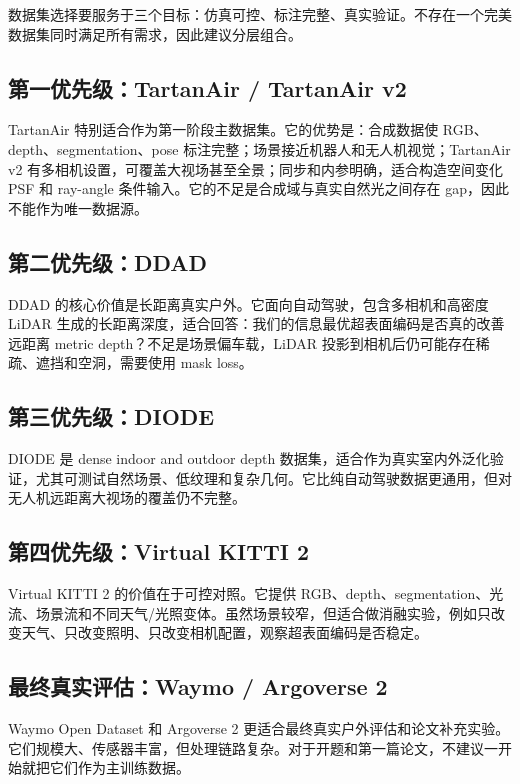 \documentclass[11pt,a4paper,fontset=none]{ctexart}
\begin{document}
数据集选择要服务于三个目标：仿真可控、标注完整、真实验证。不存在一个完美数据集同时满足所有需求，因此建议分层组合。

\subsection{第一优先级：TartanAir / TartanAir v2}

TartanAir 特别适合作为第一阶段主数据集。它的优势是：合成数据使 RGB、depth、segmentation、pose 标注完整；场景接近机器人和无人机视觉；TartanAir v2 有多相机设置，可覆盖大视场甚至全景；同步和内参明确，适合构造空间变化 PSF 和 ray-angle 条件输入。它的不足是合成域与真实自然光之间存在 gap，因此不能作为唯一数据源。

\subsection{第二优先级：DDAD}

DDAD 的核心价值是长距离真实户外。它面向自动驾驶，包含多相机和高密度 LiDAR 生成的长距离深度，适合回答：我们的信息最优超表面编码是否真的改善远距离 metric depth？不足是场景偏车载，LiDAR 投影到相机后仍可能存在稀疏、遮挡和空洞，需要使用 mask loss。

\subsection{第三优先级：DIODE}

DIODE 是 dense indoor and outdoor depth 数据集，适合作为真实室内外泛化验证，尤其可测试自然场景、低纹理和复杂几何。它比纯自动驾驶数据更通用，但对无人机远距离大视场的覆盖仍不完整。

\subsection{第四优先级：Virtual KITTI 2}

Virtual KITTI 2 的价值在于可控对照。它提供 RGB、depth、segmentation、光流、场景流和不同天气/光照变体。虽然场景较窄，但适合做消融实验，例如只改变天气、只改变照明、只改变相机配置，观察超表面编码是否稳定。

\subsection{最终真实评估：Waymo / Argoverse 2}

Waymo Open Dataset 和 Argoverse 2 更适合最终真实户外评估和论文补充实验。它们规模大、传感器丰富，但处理链路复杂。对于开题和第一篇论文，不建议一开始就把它们作为主训练数据。
\end{document}
